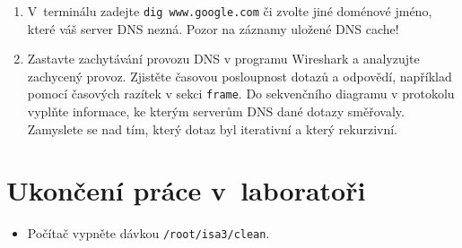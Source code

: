 \begin{enumerate}
  \item V~terminálu zadejte {\tt dig www.google.com} či zvolte jiné doménové jméno, které váš server DNS nezná. Pozor na záznamy uložené DNS cache!
  
  \item Zastavte zachytávání provozu DNS v programu Wireshark a analyzujte zachycený provoz. Zjistěte časovou posloupnost dotazů a odpovědí, například pomocí časových razítek v sekci \texttt{frame}. Do sekvenčního diagramu v  protokolu vyplňte informace, ke kterým serverům DNS dané dotazy směřovaly. Zamyslete se nad tím, který dotaz byl iterativní a který rekurzivní. 
\end{enumerate}

\section{Ukončení práce v~laboratoři}
\begin{itemize}
  \item Počítač vypněte dávkou {\tt /root/isa3/clean}.
\end{itemize}
